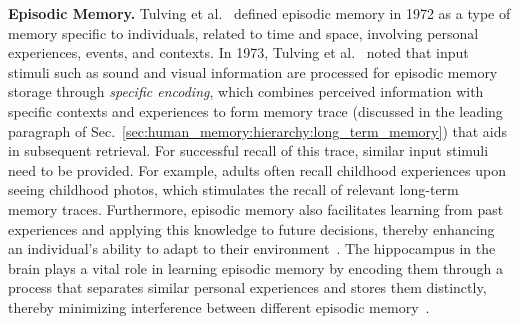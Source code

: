 \documentclass[journal,hideappendix]{vgtc}
\newenvironment{j_itemize}{
\begin{itemize}[]
  \setlength{\itemsep}{3pt}
  \setlength{\parskip}{0pt}
  \setlength{\parsep}{0pt}
}{\end{itemize}}
\begin{document}
\begin{j_itemize}

    \item[$\bullet$] \textbf{Episodic Memory.} Tulving et al.~\cite{tulving1972episodic} defined episodic memory in 1972 as a type of memory specific to individuals, related to time and space, involving personal experiences, events, and contexts. In 1973, Tulving et al.~\cite{tulving1973encoding} noted that input stimuli such as sound and visual information are processed for episodic memory storage through \textit{specific encoding}, which combines perceived information with specific contexts and experiences to form memory trace (discussed in the leading paragraph of Sec.~\ref{sec:human_memory:hierarchy:long_term_memory}) that aids in subsequent retrieval. For successful recall of this trace, similar input stimuli need to be provided. For example, adults often recall childhood experiences upon seeing childhood photos, which stimulates the recall of relevant long-term memory traces. 
    Furthermore, episodic memory also facilitates learning from past experiences and applying this knowledge to future decisions, thereby enhancing an individual's ability to adapt to their environment~\cite{tulving2002episodic}. The hippocampus in the brain plays a vital role in learning episodic memory by encoding them through a process that separates similar personal experiences and stores them distinctly, thereby minimizing interference between different episodic memory~\cite{marr1991simple,o1994hippocampal,o2014complementary}.


\end{j_itemize}
\end{document}
